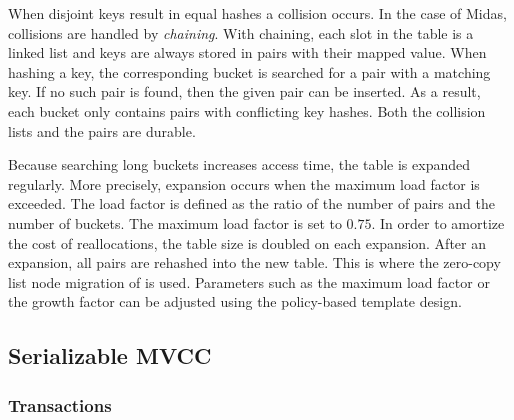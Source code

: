 When disjoint keys result in equal hashes a collision occurs. In the case of
Midas, collisions are handled by \emph{chaining}. With chaining, each slot in
the table is a linked list and keys are always stored in pairs with their mapped
value. When hashing a key, the corresponding bucket is searched for a pair with
a matching key. If no such pair is found, then the given pair can be inserted.
As a result, each bucket only contains pairs with conflicting key hashes. Both
the collision lists and the pairs are durable.

Because searching long buckets increases access time, the table is expanded
regularly. More precisely, expansion occurs when the maximum load factor is
exceeded. The load factor is defined as the ratio of the number of pairs and the
number of buckets. The maximum load factor is set to $0.75$. In order to
amortize the cost of reallocations, the table size is doubled on each expansion.
After an expansion, all pairs are rehashed into the new table. This is where the
zero-copy list node migration of  is used. Parameters such as the
maximum load factor or the growth factor can be adjusted using the policy-based
template design.




\subsection{Serializable MVCC}
\label{ch:impl-mvcc}

\subsubsection{Transactions}

